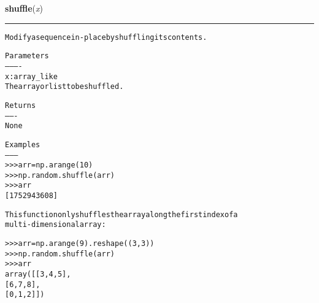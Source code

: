 \hspace{.8\funcindent}\begin{boxedminipage}{\funcwidth}

    \raggedright \textbf{shuffle}(\textit{x})

    \vspace{-1.5ex}

    \rule{\textwidth}{0.5\fboxrule}
\setlength{\parskip}{2ex}
\begin{alltt}
Modify a sequence in-place by shuffling its contents.

Parameters
----------
x : array\_like
    The array or list to be shuffled.

Returns
-------
None

Examples
--------
{\textgreater}{\textgreater}{\textgreater} arr = np.arange(10)
{\textgreater}{\textgreater}{\textgreater} np.random.shuffle(arr)
{\textgreater}{\textgreater}{\textgreater} arr
[1 7 5 2 9 4 3 6 0 8]

This function only shuffles the array along the first index of a
multi-dimensional array:

{\textgreater}{\textgreater}{\textgreater} arr = np.arange(9).reshape((3, 3))
{\textgreater}{\textgreater}{\textgreater} np.random.shuffle(arr)
{\textgreater}{\textgreater}{\textgreater} arr
array([[3, 4, 5],
       [6, 7, 8],
       [0, 1, 2]])
\end{alltt}

\setlength{\parskip}{1ex}
    \end{boxedminipage}

    \label{QSTK:qstklearn:mldiagnostics:standard_cauchy}

    \vspace{0.5ex}


